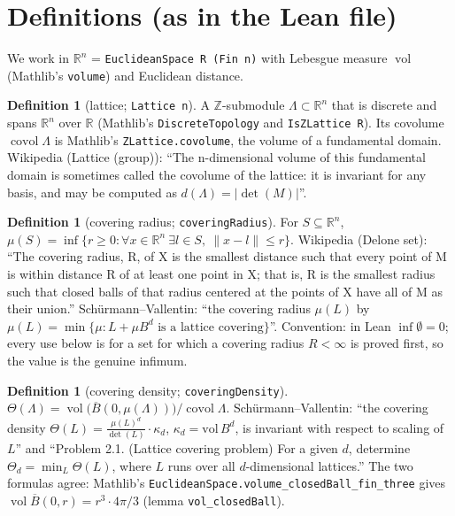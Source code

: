 \documentclass[11pt]{article}
\theoremstyle{definition}
\newtheorem{definition}[theorem]{Definition}
\theoremstyle{remark}
\newcommand{\R}{\mathbb{R}}
\newcommand{\Z}{\mathbb{Z}}
\newcommand{\covol}{\operatorname{covol}}
\newcommand{\vol}{\operatorname{vol}}
\begin{document}
\section{Definitions (as in the Lean file)}

We work in $\R^n$ = \texttt{EuclideanSpace R (Fin n)} with Lebesgue measure $\vol$ (Mathlib's
\texttt{volume}) and Euclidean distance.

\begin{definition}[lattice; \texttt{Lattice n}]
A $\Z$-submodule $\Lambda\subset\R^n$ that is discrete and spans $\R^n$ over $\R$ (Mathlib's
\texttt{DiscreteTopology} and \texttt{IsZLattice R}). Its covolume $\covol\Lambda$ is Mathlib's
\texttt{ZLattice.covolume}, the volume of a fundamental domain. Wikipedia (Lattice (group)): ``The
n-dimensional volume of this fundamental domain is sometimes called the covolume of the lattice: it is
invariant for any basis, and may be computed as $d(\Lambda)=|\det(M)|$''.
\end{definition}

\begin{definition}[covering radius; \texttt{coveringRadius}]
For $S\subseteq\R^n$, $\mu(S)=\inf\{r\ge 0 : \forall x\in\R^n\ \exists l\in S,\ \|x-l\|\le r\}$.
Wikipedia (Delone set): ``The covering radius, R, of X is the smallest distance such that every point
of M is within distance R of at least one point in X; that is, R is the smallest radius such that
closed balls of that radius centered at the points of X have all of M as their union.''
Sch\"urmann--Vallentin: ``the covering radius $\mu(L)$ by
$\mu(L)=\min\{\mu: L+\mu B^{d} \text{ is a lattice covering}\}$''.
Convention: in Lean $\inf\emptyset=0$; every use below is for a set for which a covering radius
$R<\infty$ is proved first, so the value is the genuine infimum.
\end{definition}

\begin{definition}[covering density; \texttt{coveringDensity}]
$\Theta(\Lambda)=\vol\bigl(\overline B(0,\mu(\Lambda))\bigr)/\covol\Lambda$. Sch\"urmann--Vallentin:
``the covering density $\Theta(L)=\frac{\mu(L)^{d}}{\det(L)}\cdot\kappa_{d}$, $\kappa_{d}=\mathrm{vol}\,B^{d}$,
is invariant with respect to scaling of $L$'' and ``Problem 2.1. (Lattice covering problem) For a
given $d$, determine $\Theta_{d}=\min_{L}\Theta(L)$, where $L$ runs over all $d$-dimensional
lattices.'' The two formulas agree: Mathlib's \texttt{EuclideanSpace.volume\_closedBall\_fin\_three}
gives $\vol\overline B(0,r)=r^3\cdot 4\pi/3$ (lemma \texttt{vol\_closedBall}).
\end{definition}
\end{document}
